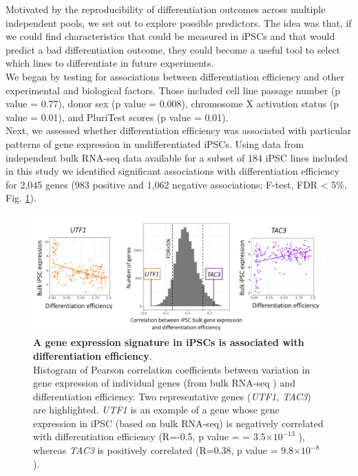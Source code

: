 Motivated by the reproducibility of differentiation outcomes across multiple independent pools, we set out to explore possible predictors.
The idea was that, if we could find characteristics that could be measured in iPSCs and that would predict 
a bad differentiation outcome, they could become a 
useful tool to select which lines to differentiate in future experiments.\\

We began by testing for associations between differentiation efficiency and other experimental and biological factors.
Those included cell line passage number (p value = 0.77), donor sex (p value = 0.008), chromosome X activation status (p value = 0.01), and PluriTest scores \cite{muller2011bioinformatic} (p value = 0.01).
\\ 

Next, we assessed whether differentiation efficiency was associated with particular patterns of gene expression in undifferentiated iPSCs. 
Using data from independent bulk RNA-seq data available for a subset of 184 iPSC lines included in this study \cite{kilpinen2017common, bonder2019systematic} we identified significant associations with differentiation efficiency for 2,045 genes (983 positive and 1,062 negative associations; F-test, FDR < 5\%, Fig. \ref{fig:neuroseq_ips_expression_signature}). 

\begin{figure}[h]
\centering
\includegraphics[width=16cm]{Chapter5/Fig/neuroseq_ips_bulk_expr_correlations.png}
\caption[iPS expression signature of differentiation efficiency]{\textbf{A gene expression signature in iPSCs is associated with differentiation efficiency}.\\
Histogram of Pearson correlation coefficients between variation in gene expression of individual genes (from bulk RNA-seq \cite{bonder2019systematic}) and differentiation efficiency. 
Two representative genes (\textit{UTF1, TAC3}) are highlighted. 
\textit{UTF1} is an example of a gene whose gene expression in iPSC (based on bulk RNA-seq) is negatively correlated with differentiation efficiency (R=-0.5, p value = = 3.5$ \times 10^{-13}$ ), whereas \textit{TAC3} is positively correlated (R=0.38, p value = 9.8$ \times 10^{-8}$).}
\label{fig:neuroseq_ips_expression_signature}
\end{figure}

